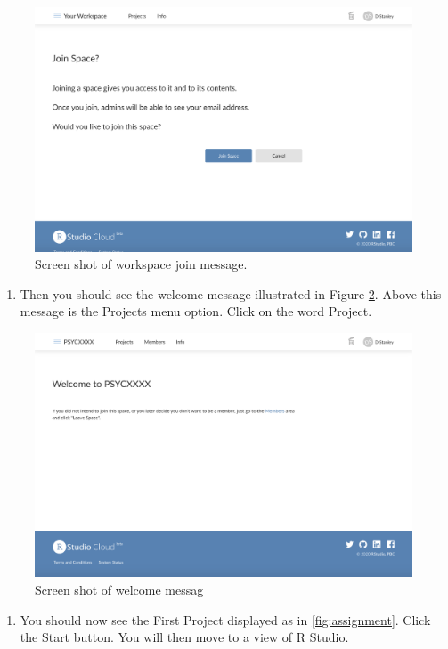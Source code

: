 \documentclass[
]{krantz}
\providecommand{\tightlist}{%
  \setlength{\itemsep}{0pt}\setlength{\parskip}{0pt}}
\begin{document}
\begin{figure}
\includegraphics[width=0.7\linewidth]{ch_introduction/images/screenshot_join} \caption{Screen shot of workspace join message.}\label{fig:join}
\end{figure}

\begin{enumerate}
\def\labelenumi{\arabic{enumi}.}
\setcounter{enumi}{3}
\tightlist
\item
  Then you should see the welcome message illustrated in Figure \ref{fig:welcome}. Above this message is the Projects menu option. Click on the word Project.
\end{enumerate}

\begin{figure}
\includegraphics[width=0.7\linewidth]{ch_introduction/images/screenshot_welcome} \caption{Screen shot of welcome messag}\label{fig:welcome}
\end{figure}

\begin{enumerate}
\def\labelenumi{\arabic{enumi}.}
\setcounter{enumi}{4}
\tightlist
\item
  You should now see the First Project displayed as in \ref{fig:assignment}. Click the Start button. You will then move to a view of R Studio.
\end{enumerate}
\end{document}
